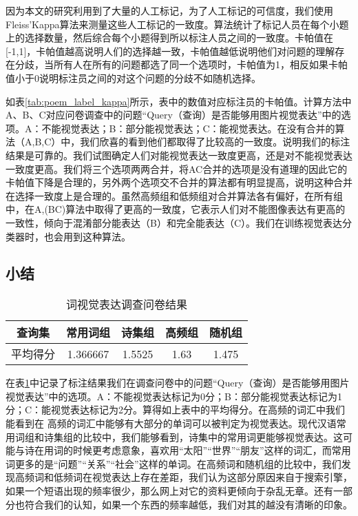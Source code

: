 因为本文的研究利用到了大量的人工标记，为了人工标记的可信度，我们使用Fleiss'Kappa算法来测量这些人工标记的一致度。算法统计了标记人员在每个小题上的选择数量，然后综合每个小题得到所以标注人员之间的一致度。卡帕值在[-1,1]，卡帕值越高说明人们的选择越一致，卡帕值越低说明他们对问题的理解存在分歧，当所有人在所有的问题都选了同一个选项时，卡帕值为1，相反如果卡帕值小于0说明标注员之间的对这个问题的分歧不如随机选择。

如表\ref{tab:poem_label_kappa}所示，表中的数值对应标注员的卡帕值。计算方法中A、B、C对应问卷调查中的问题“Query（查询）是否能够用图片视觉表达”中的选项。A：不能视觉表达；B：部分能视觉表达；C：能视觉表达。在没有合并的算法（A,B,C）中，我们欣喜的看到他们都取得了比较高的一致度。说明我们的标注结果是可靠的。我们试图确定人们对能视觉表达一致度更高，还是对不能视觉表达一致度更高。我们将三个选项两两合并，将AC合并的选项是没有道理的因此它的卡帕值下降是合理的，另外两个选项交不合并的算法都有明显提高，说明这种合并在选择一致度上是合理的。虽然高频组和低频组对合并算法各有偏好，在所有组中，在A,(BC)算法中取得了更高的一致度，它表示人们对不能图像表达有更高的一致性，倾向于混淆部分能表达（B）和完全能表达（C）。我们在训练视觉表达分类器时，也会用到这种算法。

\subsection{小结}

\begin{table}[htbp]
\centering
\caption{词视觉表达调查问卷结果} \label{tab:poem_result}
\begin{tabular}{ |c|c|c|c|c|}
    \hline
		查询集 & 常用词组 & 诗集组 &  高频组 & 随机组 \\
	\hline 
		平均得分 & 1.366667 & 1.5525   &1.63 & 1.475 \\
 	\hline
\end{tabular}
\end{table}

在表\ref{tab:poem_result}中记录了标注结果我们在调查问卷中的问题“Query（查询）是否能够用图片视觉表达”中的选项。A：不能视觉表达标记为0分；B：部分能视觉表达标记为1分；C：能视觉表达标记为2分。算得如上表中的平均得分。在高频的词汇中我们能看到在
高频的词汇中能够有大部分的单词可以被判定为视觉表达。现代汉语常用词组和诗集组的比较中，我们能够看到，诗集中的常用词更能够视觉表达。这可能与诗在用词的时候更考虑意象，喜欢用“太阳”“世界”“朋友”这样的词汇，而常用词更多的是“问题”“关系”“社会”这样的单词。在高频词和随机组的比较中，我们发现高频词和低频词在视觉表达上存在差距，我们认为这部分原因来自于搜索引擎，如果一个短语出现的频率很少，那么网上对它的资料更倾向于杂乱无章。还有一部分也符合我们的认知，如果一个东西的频率越低，我们对其的越没有清晰的印象。






